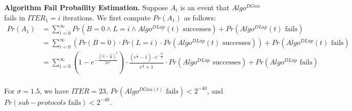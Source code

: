     \textbf{Algorithm Fail Probaility Estimation. }
    Suppose $A_i$ is an event that $Algo^{DGau}$ fails in $ITER_1=i$ iterations.
    We first compute $Pr\left(A_1\right) $ as follows:
    \begin{equation}
        \begin{split}
            Pr\left(A_1\right) &=\sum_{i = 0}^{\infty}  Pr\left( B= 0 \land L=i \land Algo^{DLap}\left(t\right)  \text{ successes}\right) + Pr\left(Algo^{DLap}\left(t\right)  \text{ fails}\right) \\
            &= \sum_{i = 0}^{\infty}  \left(Pr\left( B= 0 \right) \cdot Pr\left( L=i \right)\cdot Pr\left(  Algo^{DLap}\left(t\right)  \text{ successes}\right)\right) + Pr\left(Algo^{DLap}\left(t\right)  \text{ fails}\right) \\
            &=\sum_{i = 0}^{\infty} \left(1-e^{-\frac{\left(\left\lvert i\right\rvert-\frac{\sigma^2}{t}\right)^2  }{2\sigma^2}}\right)  \cdot \frac{\left(e^{\frac{1}{t}}-1\right) \cdot  e^{-\frac{\left\lvert i\right\rvert }{d}}}{e^{\frac{1}{t}}+1} \cdot Pr\left(Algo^{DLap} \text{ successes}\right)  + Pr\left(Algo^{DLap} \text{ fails}\right) \\
        \end{split}
    \end{equation}

    For $\sigma =1.5$, we have $ITER=23$, $Pr\left( Algo^{DGau\left(t\right) } \text{ fails} \right) <2^{-40}$, and $Pr\left( sub-protocols  \text{ fails} \right) <2^{-40}$.

